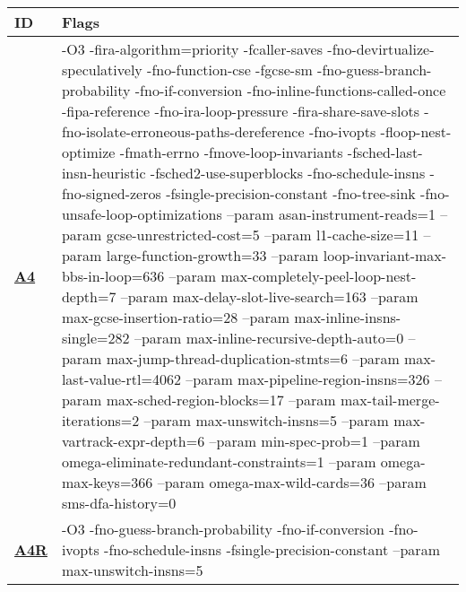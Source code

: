     \begin{tabular}{|l|p{6.2in}|}
     \hline
      \textbf{ID} & \textbf{Flags} \\ 
     \hline
      \textbf{ \href{http://cknowledge.org/repo/web.php?wcid=experiment:8556dbf4e51a825d\&subpoint=86ca1630895041c1}{A4} } & {\small -O3 -fira-algorithm=priority -fcaller-saves -fno-devirtualize-speculatively -fno-function-cse -fgcse-sm -fno-guess-branch-probability -fno-if-conversion -fno-inline-functions-called-once -fipa-reference -fno-ira-loop-pressure -fira-share-save-slots -fno-isolate-erroneous-paths-dereference -fno-ivopts -floop-nest-optimize -fmath-errno -fmove-loop-invariants -fsched-last-insn-heuristic -fsched2-use-superblocks -fno-schedule-insns -fno-signed-zeros -fsingle-precision-constant -fno-tree-sink -fno-unsafe-loop-optimizations --param asan-instrument-reads=1 --param gcse-unrestricted-cost=5 --param l1-cache-size=11 --param large-function-growth=33 --param loop-invariant-max-bbs-in-loop=636 --param max-completely-peel-loop-nest-depth=7 --param max-delay-slot-live-search=163 --param max-gcse-insertion-ratio=28 --param max-inline-insns-single=282 --param max-inline-recursive-depth-auto=0 --param max-jump-thread-duplication-stmts=6 --param max-last-value-rtl=4062 --param max-pipeline-region-insns=326 --param max-sched-region-blocks=17 --param max-tail-merge-iterations=2 --param max-unswitch-insns=5 --param max-vartrack-expr-depth=6 --param min-spec-prob=1 --param omega-eliminate-redundant-constraints=1 --param omega-max-keys=366 --param omega-max-wild-cards=36 --param sms-dfa-history=0 }\\
     \hline
      \textbf{ \href{http://cknowledge.org/repo/web.php?wcid=experiment:98688a71f99ac30b\&subpoint=4bcd9dad6b249a79}{A4R} } & {\small -O3 -fno-guess-branch-probability -fno-if-conversion -fno-ivopts -fno-schedule-insns -fsingle-precision-constant --param max-unswitch-insns=5 }\\
     \hline
    \end{tabular}    